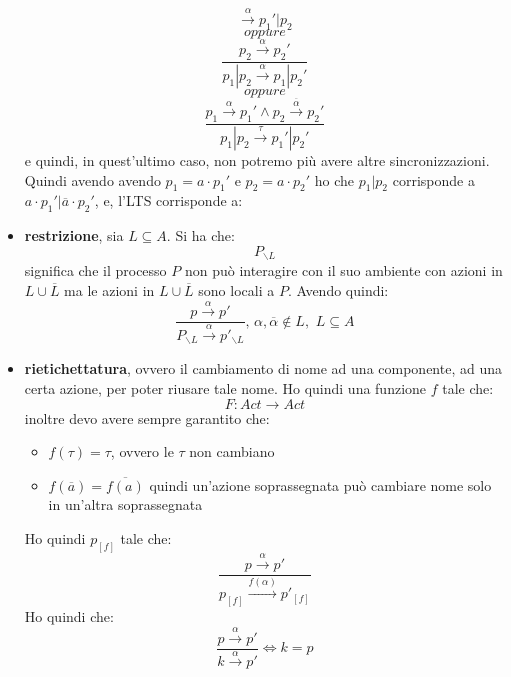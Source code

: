 \documentclass[a4paper,12pt, oneside]{book}
\begin{document}
\begin{itemize}
\[{      \stackrel{\alpha}{\rightarrow}p_1'|p_2}\]
  \[oppure\]
  \[\frac{p_2\stackrel{\alpha}{\rightarrow}p_2'}{p_1|p_2
      \stackrel{\alpha}{\rightarrow}p_1|p_2'}\]
  \[oppure\]
  \[\frac{p_1\stackrel{\alpha}{\rightarrow}p_1'\land p_2
      \stackrel{\overline{\alpha}}{\rightarrow}p_2'}{p_1|p_2
      \stackrel{\tau}{\rightarrow}p_1'|p_2'}\]
  e quindi, in quest'ultimo caso, non potremo più avere altre
  sincronizzazioni. \\
  Quindi avendo avendo $p_1=a\cdot p_1'$ e $p_2=a\cdot p_2'$ ho che $p_1|p_2$
  corrisponde a $a\cdot p_1'|\overline{a}\cdot p_2'$, e, l'LTS corrisponde a:
  \begin{center}
  \end{center}
  \item \textbf{restrizione}, sia $L\subseteq A$. Si ha che:
  \[P_{\backslash L}\]
  significa che il processo $P$ non può interagire con il suo ambiente con
  azioni in $L\cup \overline{L}$ ma le azioni in $L\cup \overline{L}$ sono
  locali a $P$. Avendo quindi:
  \[\frac{p\stackrel{\alpha}{\rightarrow}p'}{P_{\backslash L}
      \stackrel{\alpha}{\rightarrow}p'_{\backslash L}}
    ,\,\alpha,\overline{\alpha}\not\in L,\,\,L\subseteq A\]
  \item \textbf{rietichettatura}, ovvero il cambiamento di nome ad una
  componente, ad una certa azione, per poter riusare tale nome. Ho quindi una
  funzione $f$ tale che:
  \[F:Act\to Act\]
  inoltre devo avere sempre garantito che:
  \begin{itemize}
    \item $f(\tau)=\tau$, ovvero le $\tau$ non cambiano
    \item $f(\overline{a})=\overline{f(a)}$ quindi un'azione soprassegnata può
    cambiare nome solo in un'altra soprassegnata
  \end{itemize}
  Ho quindi $p_{[f]}$ tale che:
  \[\frac{p\stackrel{\alpha}{\rightarrow}p'}{p_{[f]}
      \stackrel{f(\alpha)}{\rightarrow}p'_{[f]}}\]
  Ho quindi che:
  \[\frac{p\stackrel{\alpha}{\rightarrow}p'}{k
      \stackrel{\alpha}{\rightarrow}p'}\iff k=p\]
\end{itemize}
\end{document}
